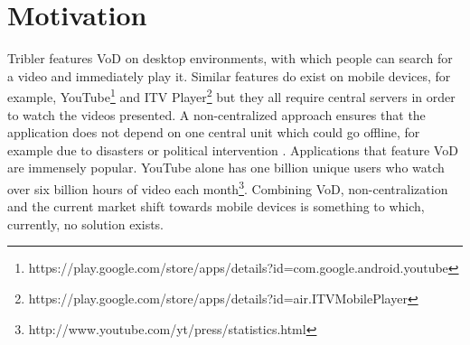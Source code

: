 \section{Motivation}
\label{sec:motivation}
Tribler features VoD on desktop environments, with which people can search for a video and immediately play it. Similar features do exist on mobile devices, for example, YouTube\footnote{https://play.google.com/store/apps/details?id=com.google.android.youtube} and ITV Player\footnote{https://play.google.com/store/apps/details?id=air.ITVMobilePlayer} but they all require central servers in order to watch the videos presented. A non-centralized approach ensures that the application does not depend on one central unit which could go offline, for example due to disasters or political intervention \cite{compnet}. Applications that feature VoD are immensely popular. YouTube alone has one billion unique users who watch over six billion hours of video each month\footnote{http://www.youtube.com/yt/press/statistics.html}. Combining VoD, non-centralization and the current market shift towards mobile devices is something to which, currently, no solution exists.
